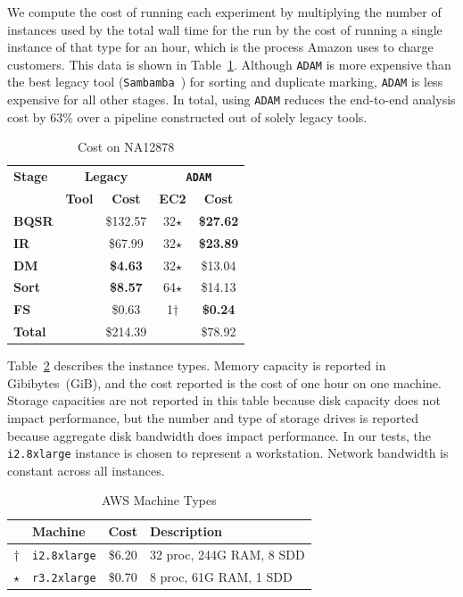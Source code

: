 \documentclass{acm_proc_article-sp}
\begin{document}
We compute the cost of running each experiment by multiplying the number of instances
used by the total wall time for the run by the cost of running a single instance of that type for an hour, which is
the process Amazon uses to charge customers. This data is shown in Table~\ref{tab:cost}. Although \texttt{ADAM}
is more expensive than the best legacy tool (\texttt{Sambamba}~\cite{tarasov15}) for sorting and duplicate marking,
\texttt{ADAM} is less expensive for all other stages. In total, using \texttt{ADAM} reduces the end-to-end analysis cost
by 63\% over a pipeline constructed out of solely legacy tools.

\begin{table}[h]
\caption{Cost on NA12878}
\label{tab:cost}
\begin{center}
\begin{tabular}{ l | c c | c c }
\hline
\bf Stage & \multicolumn{2}{c}{\bf Legacy} & \multicolumn{2}{c}{\bf \texttt{ADAM}} \\
 & \bf Tool & \bf Cost & \bf EC2 & \bf Cost \\
\hline
\bf BQSR & \cite{depristo11} & \$132.57 & 32$\star$ & \bf \$27.62 \\
\bf IR & \cite{depristo11} & \$67.99 & 32$\star$ & \bf \$23.89 \\
\bf DM & \cite{tarasov15} & \bf \$4.63 & 32$\star$ & \$13.04 \\
\bf Sort & \cite{tarasov15} & \bf \$8.57 & 64$\star$ & \$14.13 \\
\bf FS & \cite{tarasov15} & \$0.63 & 1$\dagger$ & \bf \$0.24 \\
\hline
\bf Total & & \$214.39 & & \$78.92 \\
\end{tabular}
\end{center}
\end{table}

Table~\ref{tab:machines} describes the instance types. Memory capacity is reported in Gibibytes~(GiB),
and the cost reported is the cost of one hour on one machine.
Storage capacities are not reported in this table because disk
capacity does not impact performance, but the number and type of storage drives is reported because
aggregate disk bandwidth does impact performance. In our tests, the \texttt{i2.8xlarge} instance is
chosen to represent a workstation. Network bandwidth is constant across all instances.

\begin{table}[h]
\caption{AWS Machine Types}
\label{tab:machines}
\begin{center}
\begin{tabular}{ c l c l }
\hline
 & \bf Machine & \bf Cost & \bf Description \\
\hline
\hline
$\dagger$ & \texttt{i2.8xlarge} & \$6.20 & 32 proc, 244G RAM, 8 SDD \\
$\star$ & \texttt{r3.2xlarge} & \$0.70 & 8 proc, 61G RAM, 1 SDD \\
\hline
\end{tabular}
\end{center}
\end{table}
\end{document}
